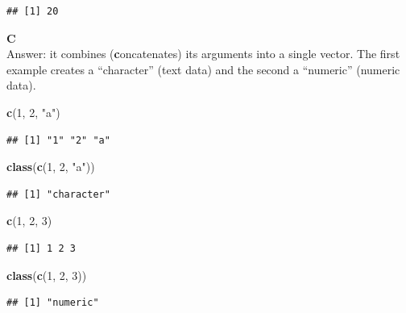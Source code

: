 \documentclass[]{book}
\newenvironment{Shaded}{\begin{snugshade}}{\end{snugshade}}
\newcommand{\DecValTok}[1]{\textcolor[rgb]{0.00,0.00,0.81}{#1}}
\newcommand{\KeywordTok}[1]{\textcolor[rgb]{0.13,0.29,0.53}{\textbf{#1}}}
\newcommand{\NormalTok}[1]{#1}
\newcommand{\StringTok}[1]{\textcolor[rgb]{0.31,0.60,0.02}{#1}}
\begin{document}
\begin{verbatim}
## [1] 20
\end{verbatim}

\textbf{C}\\
Answer: it combines (\textbf{c}oncatenates) its arguments into a single vector. The first example creates a ``character'' (text data) and the second a ``numeric'' (numeric data).

\begin{Shaded}
\begin{Highlighting}[]
\KeywordTok{c}\NormalTok{(}\DecValTok{1}\NormalTok{, }\DecValTok{2}\NormalTok{, }\StringTok{"a"}\NormalTok{)}
\end{Highlighting}
\end{Shaded}

\begin{verbatim}
## [1] "1" "2" "a"
\end{verbatim}

\begin{Shaded}
\begin{Highlighting}[]
\KeywordTok{class}\NormalTok{(}\KeywordTok{c}\NormalTok{(}\DecValTok{1}\NormalTok{, }\DecValTok{2}\NormalTok{, }\StringTok{"a"}\NormalTok{))}
\end{Highlighting}
\end{Shaded}

\begin{verbatim}
## [1] "character"
\end{verbatim}

\begin{Shaded}
\begin{Highlighting}[]
\KeywordTok{c}\NormalTok{(}\DecValTok{1}\NormalTok{, }\DecValTok{2}\NormalTok{, }\DecValTok{3}\NormalTok{)}
\end{Highlighting}
\end{Shaded}

\begin{verbatim}
## [1] 1 2 3
\end{verbatim}

\begin{Shaded}
\begin{Highlighting}[]
\KeywordTok{class}\NormalTok{(}\KeywordTok{c}\NormalTok{(}\DecValTok{1}\NormalTok{, }\DecValTok{2}\NormalTok{, }\DecValTok{3}\NormalTok{))}
\end{Highlighting}
\end{Shaded}

\begin{verbatim}
## [1] "numeric"
\end{verbatim}
\end{document}
